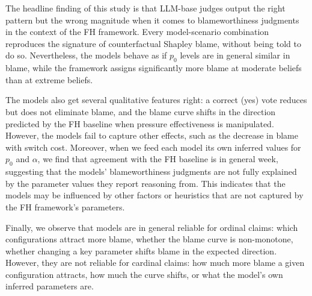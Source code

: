 \documentclass{article}
\begin{document}
The headline finding of this study is that LLM-base judges output the right pattern but the wrong magnitude when it comes to blameworthiness judgments in the context of the FH framework. Every model-scenario combination reproduces the signature of counterfactual Shapley blame, without being told to do so. Nevertheless, the models behave as if $p_0$ levels are in general similar in blame, while the framework assigns significantly more blame at moderate beliefs than at extreme beliefs.

The models also get several qualitative features right: a correct (yes) vote reduces but does not eliminate blame, and the blame curve shifts in the direction predicted by the FH baseline when pressure effectiveness is manipulated. However, the models fail to capture other effects, such as the decrease in blame with switch cost. Moreover, when we feed each model its own inferred values for $p_0$ and $\alpha$, we find that agreement with the FH baseline is in general week, suggesting that the models' blameworthiness judgments are not fully explained by the parameter values they report reasoning from. This indicates that the models may be influenced by other factors or heuristics that are not captured by the FH framework's parameters.

Finally, we observe that models are in general reliable for ordinal claims: which configurations attract more blame, whether the blame curve is non-monotone, whether changing a key parameter shifts blame in the expected direction. However, they are not reliable for cardinal claims: how much more blame a given configuration attracts, how much the curve shifts, or what the model's own inferred parameters are. 
\end{document}

